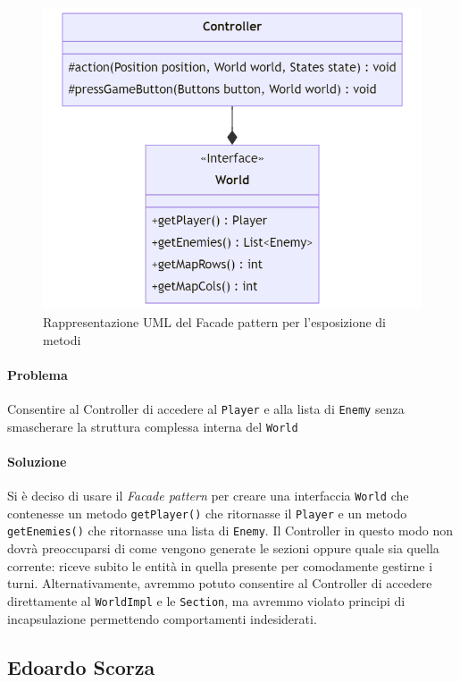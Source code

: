\documentclass[a4paper,12pt]{report}
\begin{document}
\begin{figure}[H]
	\centering{}
	\includegraphics[width=\textwidth]{img/WorldFacade.png}
	\caption{Rappresentazione UML del Facade pattern per l'esposizione di metodi}
	\label{img:WorldFacade}
\end{figure}

\paragraph{Problema} Consentire al Controller di accedere al \texttt{Player} e alla lista di \texttt{Enemy} senza smascherare la struttura complessa interna del \texttt{World}
\paragraph{Soluzione} Si è deciso di usare il \textit{Facade pattern} per creare una interfaccia \texttt{World} che contenesse un metodo \texttt{getPlayer()} che ritornasse il \texttt{Player} e un metodo \texttt{getEnemies()} che ritornasse una lista di \texttt{Enemy}. Il Controller in questo modo non dovrà preoccuparsi di come vengono generate le sezioni oppure quale sia quella corrente: riceve subito le entità in quella presente per comodamente gestirne i turni. Alternativamente, avremmo potuto consentire al Controller di accedere direttamente al \texttt{WorldImpl} e le \texttt{Section}, ma avremmo violato principi di incapsulazione permettendo comportamenti indesiderati.

\subsection*{Edoardo Scorza}
\end{document}
